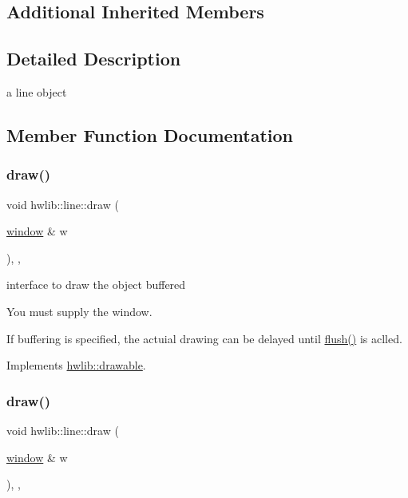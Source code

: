 \subsection*{Additional Inherited Members}


\subsection{Detailed Description}
a line object 

\subsection{Member Function Documentation}
\mbox{\label{classhwlib_1_1line_a0a30c7c7e88377aada5ee1ec422bfc84}} 
\subsubsection{\texorpdfstring{draw()}{draw()}\hspace{0.1cm}{\footnotesize\ttfamily [1/2]}}
{\footnotesize\ttfamily void hwlib\+::line\+::draw (\begin{DoxyParamCaption}\item[{\hyperlink{classhwlib_1_1window}{window} \&}]{w }\end{DoxyParamCaption})\hspace{0.3cm}{\ttfamily [inline]}, {\ttfamily [override]}, {\ttfamily [virtual]}}



interface to draw the object buffered 

You must supply the window.

If buffering is specified, the actuial drawing can be delayed until \hyperlink{namespacehwlib_a648fe94ca9899747a632c23f97007732}{flush()} is aclled. 

Implements \hyperlink{classhwlib_1_1drawable_ac9ea0de52a14d9024cb34110f794ac28}{hwlib\+::drawable}.

\mbox{\label{classhwlib_1_1line_a0a30c7c7e88377aada5ee1ec422bfc84}} 
\subsubsection{\texorpdfstring{draw()}{draw()}\hspace{0.1cm}{\footnotesize\ttfamily [2/2]}}
{\footnotesize\ttfamily void hwlib\+::line\+::draw (\begin{DoxyParamCaption}\item[{\hyperlink{classhwlib_1_1window}{window} \&}]{w }\end{DoxyParamCaption})\hspace{0.3cm}{\ttfamily [inline]}, {\ttfamily [override]}, {\ttfamily [virtual]}}



